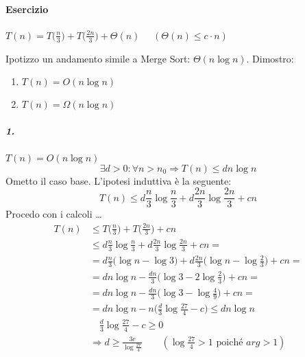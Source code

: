 \paragraph{Esercizio} $T(n) = T\big(\frac{n}{3} \big) + T\big(\frac{2n}{3} \big) + \Theta (n)$
$\quad (\Theta (n) \leq c \cdot n)$\par
Ipotizzo un andamento simile a Merge Sort: $\Theta (n \log n)$. Dimostro:  
\begin{enumerate}
	\item $T(n) = O(n \log n)$
	\item $T(n) = \Omega (n \log n)$
\end{enumerate}

\subparagraph{1.} $T(n) = O(n \log n)$
$$\exists d > 0 : \forall n > n_0 \Rightarrow T(n) \leq dn \log n$$
Ometto il caso base. L'ipotesi induttiva è la seguente:
\[ 
	T(n) \leq d \frac{n}{3} \log \frac{n}{3} + d \frac{2n}{3} \log \frac{2n}{3} + cn
\]
Procedo con i calcoli \dots
\begin{align*}
	T(n) & \leq T\Big(\frac{n}{3} \Big) + T\Big(\frac{2n}{3} \Big) + cn \\
	& \leq d \frac{n}{3} \log \frac{n}{3} + d \frac{2n}{3} \log \frac{2n}{3} + cn = \\
	& = d \frac{n}{3} \Big(\log n - \log 3 \Big) + d \frac{2n}{3} \Big(\log n - \log \frac{2}{3} \Big) + cn = \\
	& = dn \log n - \frac{dn}{3} \Big( \log 3 - 2 \log \frac{2}{3} \Big) + cn = \\
	& = dn \log n - \frac{dn}{3} \Big( \log 3 - \log \frac{4}{9} \Big) + cn = \\
	& = dn \log n - n \Big( \frac{d}{3} \log \frac{27}{4} - c \Big) \leq dn \log n\\
	& \quad \frac{d}{3} \log \frac{27}{4} - c \geq 0 \\
	& \Rightarrow d \geq \frac{3c}{\log \frac{27}{4}} \qquad (\log \frac{27}{4} > 1 \text{ poiché } arg > 1)
\end{align*}

